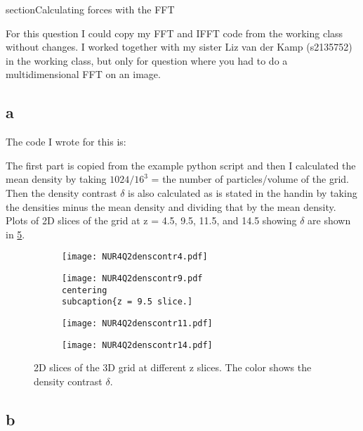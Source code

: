section{Calculating forces with the FFT}

For this question I could copy my FFT and IFFT code from the working class without changes. 
I worked together with my sister Liz van der Kamp (s2135752) in the working class, but only for question where you had to do a multidimensional FFT on an image. 

\subsection*{a}

The code I wrote for this is:


The first part is copied from the example python script and then I calculated the mean density by taking $1024/16^3$ = the number of particles/volume of the grid. Then the density contrast $\delta$ is also calculated as is stated in the handin by taking the densities minus the mean density and dividing that by the mean density. 
Plots of 2D slices of the grid at z = 4.5, 9.5, 11.5, and 14.5 showing $\delta$ are shown in \ref{fig:fig1}.

\begin{figure}[ht]
    \begin{subfigure}{.49\textwidth}
       \centering
    \texttt{[image: NUR4Q2denscontr4.pdf]}
    \centering
    \label{}
    \end{subfigure}
    \hfill
    \begin{subfigure}{.49\textwidth}
       \centering
    \texttt{[image: NUR4Q2denscontr9.pdf
    \\centering
    \\subcaption\{z = 9.5 slice.]}
    \label{}
    \end{subfigure}
     \begin{subfigure}{.49\textwidth}
       \centering
    \texttt{[image: NUR4Q2denscontr11.pdf]}
    \centering
    \label{}
    \end{subfigure}
     \begin{subfigure}{.49\textwidth}
       \centering
    \texttt{[image: NUR4Q2denscontr14.pdf]}
    \centering
    \label{}
    \end{subfigure}
    \caption{2D slices of the 3D grid at different z slices. The color shows the density contrast $\delta$.}
    \label{fig:fig1}
\end{figure}

\subsection*{b}

